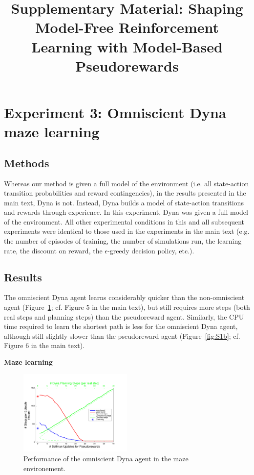 \documentclass[letterpaper]{article}
\begin{document}
%

\title{Supplementary Material: Shaping Model-Free Reinforcement Learning with Model-Based Pseudorewards}
\date{}
\maketitle

\pagebreak

\section{Experiment 3: Omniscient Dyna maze learning}

\subsection{Methods}

Whereas our method is given a full model of the environment (i.e. all state-action transition probabilities and reward contingencies), in the results presented in the main text, Dyna is not. Instead, Dyna builds a model of state-action transitions and rewards through experience. In this experiment, Dyna was given a full model of the environment. All other experimental conditions in this and all subsequent experiments were identical to those used in the experiments in the main text (e.g. the number of episodes of training, the number of simulations run, the learning rate, the discount on reward, the $\epsilon$-greedy decision policy, etc.).

\subsection{Results}

The omniscient Dyna agent learns considerably quicker than the non-omniscient agent (Figure~\ref{fig:S1a}; cf. Figure 5 in the main text), but still requires more steps (both real steps and planning steps) than the pseudoreward agent. Similarly, the CPU time required to learn the shortest path is less for the omniscient Dyna agent, although still slightly slower than the pseudoreward agent (Figure~\ref{fig:S1b}; cf. Figure 6 in the main text).

\textbf{Maze learning}

\begin{figure}[ht]
\centering
\includegraphics[width=0.5\textwidth]{learning_vs_PRiterations_omniscientDYNA_mean}
\caption{Performance of the omniscient Dyna agent in the maze environement.}
\label{fig:S1a}
\end{figure}
\end{document}
